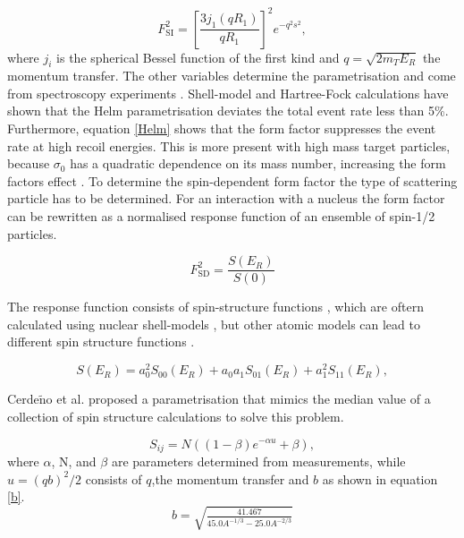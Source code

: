 \documentclass{article}
\begin{document}
\begin{equation} \label{Helm}
    F^2_\text{SI} = \left[ \frac{3 j_1(qR_1)}{qR_1} \right]^2 e^{-q^2 s^2}, 
\end{equation}
where $j_i$ is the spherical Bessel function of the first kind and $q = \sqrt{2m_T E_R}$ the momentum transfer. The other variables determine the parametrisation and come from spectroscopy experiments \cite{Fricke:1995zz}. Shell-model \cite{Vietze:2014vsa} and Hartree-Fock calculations \cite{Co:2012adt, Duda:2006uk} have shown that the Helm parametrisation deviates the total event rate less than 5\%. Furthermore, equation \ref{Helm} shows that the form factor suppresses the event rate at high recoil energies. This is more present with high mass target particles, because $\sigma_0$ has a quadratic dependence on its mass number, increasing the form factors effect \cite{Undagoitia:2015gya}. To determine the spin-dependent form factor the type of scattering particle has to be determined. For an interaction with a nucleus the form factor can be rewritten as a normalised response function of an ensemble of spin-1/2 particles. 

\begin{equation} \label{SD_Form}
    F^2_\text{SD} = \frac{S(E_R)}{S(0)}
\end{equation}

The response function consists of spin-structure functions \cite{Cannoni:2011iu}, which are oftern calculated using nuclear shell-models \cite{Ressell:1997kx,Toivanen:2009zza}, but other atomic models can lead to different spin structure functions \cite{Ellis:1987sh, Engel:1989ix, Iachello:1990ut}.

\begin{equation} \label{Response}
    S(E_R) = a^2_0 S_{00}(E_R) + a_0a_1S_{01}(E_R) + a_1^2 S_{11}(E_R),
\end{equation}

Cerde$\tilde{\text{n}}$o et al.\cite{Cerdeno:2012ix} proposed a parametrisation that mimics the median value of a collection of spin structure calculations to solve this problem. 

\begin{equation}
    S_{ij} = N((1-\beta)e^{-\alpha u} + \beta), 
\end{equation}
where $\alpha$, N, and $\beta$ are parameters determined from measurements, while $u = (qb)^2/2$ consists of $q$,the momentum transfer and $b$ as shown in equation \ref{b}.
 \begin{equation} \label{b}
     b = \sqrt{\tfrac{41.467}{45.0A^{-1/3}-25.0A^{-2/3}}}
 \end{equation}
\end{document}
